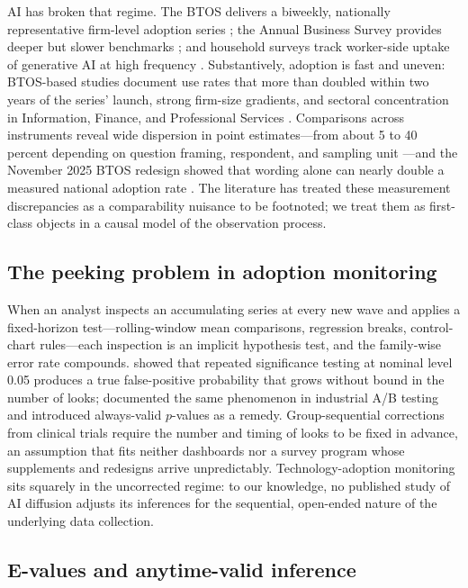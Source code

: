 \documentclass[review,authoryear,12pt]{elsarticle}
\begin{document}
AI has broken that regime. The BTOS delivers a biweekly, nationally representative firm-level adoption series \citep{bonney2024}; the Annual Business Survey provides deeper but slower benchmarks \citep{zolas2020,mcelheran2024}; and household surveys track worker-side uptake of generative AI at high frequency \citep{bickblandin2025}. Substantively, adoption is fast and uneven: BTOS-based studies document use rates that more than doubled within two years of the series' launch, strong firm-size gradients, and sectoral concentration in Information, Finance, and Professional Services \citep{censusstory2026,garcialuna2026}. Comparisons across instruments reveal wide dispersion in point estimates---from about 5 to 40 percent depending on question framing, respondent, and sampling unit \citep{crane2025}---and the November 2025 BTOS redesign showed that wording alone can nearly double a measured national adoption rate \citep{bick2026,fed2026}. The literature has treated these measurement discrepancies as a comparability nuisance to be footnoted; we treat them as first-class objects in a causal model of the observation process.

\subsection{The peeking problem in adoption monitoring}

When an analyst inspects an accumulating series at every new wave and applies a fixed-horizon test---rolling-window mean comparisons, regression breaks, control-chart rules---each inspection is an implicit hypothesis test, and the family-wise error rate compounds. \citet{armitage1969} showed that repeated significance testing at nominal level 0.05 produces a true false-positive probability that grows without bound in the number of looks; \citet{johari2022} documented the same phenomenon in industrial A/B testing and introduced always-valid $p$-values as a remedy. Group-sequential corrections from clinical trials require the number and timing of looks to be fixed in advance, an assumption that fits neither dashboards nor a survey program whose supplements and redesigns arrive unpredictably. Technology-adoption monitoring sits squarely in the uncorrected regime: to our knowledge, no published study of AI diffusion adjusts its inferences for the sequential, open-ended nature of the underlying data collection.

\subsection{E-values and anytime-valid inference}
\end{document}
